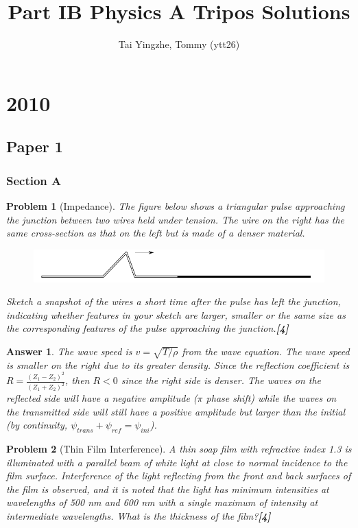 \documentclass[a4paper]{article}
\title{\textbf{Part IB Physics A Tripos Solutions}}
\author{Tai Yingzhe, Tommy (ytt26)}
\date{}
\newtheorem{ans}{Answer}[subsection]
\theoremstyle{new}
\newtheorem{qns}{Problem}[subsection]
\begin{document}
\maketitle
{\small\tableofcontents}

\newpage
\section{2010}
\subsection{Paper 1}
\subsubsection{Section A}
\begin{qns}[Impedance]
The figure below shows a triangular pulse approaching the junction between two wires held under tension. The wire on the right has the same cross-section as that on the left but is made of a denser material.
\begin{figure}[H]
    \centering
    \includegraphics[scale=0.5]{2010P1A1Q.PNG}
\end{figure}
Sketch a snapshot of the wires a short time after the pulse has left the junction, indicating whether features in your sketch are larger, smaller or the same size as the corresponding features of the pulse approaching the junction.\hfill\textbf{[4]}
\end{qns}
\begin{ans}
The wave speed is $v=\sqrt{T/\rho}$ from the wave equation. The wave speed is smaller on the right due to its greater density. Since the reflection coefficient is $R=\frac{(Z_1-Z_2)^2}{(Z_1+Z_2)^2}$, then $R<0$ since the right side is denser. The waves on the reflected side will have a negative amplitude ($\pi$ phase shift) while the waves on the transmitted side will still have a positive amplitude but larger than the initial (by continuity, $\psi_{trans}+\psi_{ref}=\psi_{ini}$). 
\end{ans}
\begin{qns}[Thin Film Interference]
A thin soap film with refractive index 1.3 is illuminated with a parallel beam of white light at close to normal incidence to the film surface. Interference of the light reflecting from the front and back surfaces of the film is observed, and it is noted that the light has minimum intensities at wavelengths of 500 nm and 600 nm with a single maximum of intensity at intermediate wavelengths. What is the thickness of the film?\hfill\textbf{[4]}
\end{qns}
\end{document}
